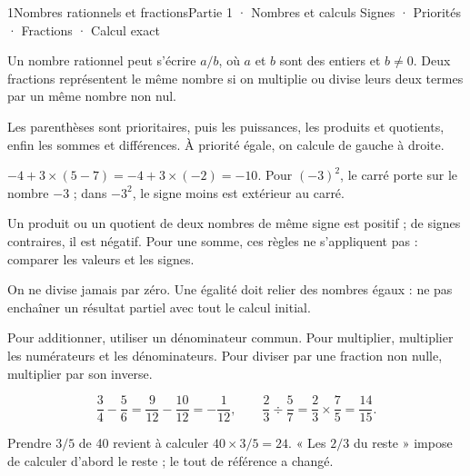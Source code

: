 \begin{ouverture}[courbe]{1}{Nombres rationnels et fractions}{Partie 1 · Nombres et calculs}
{Signes · Priorités · Fractions · Calcul exact}
\end{ouverture}
\pagestyle{otMain}\essentiel\fontsize{11}{15}\selectfont
{}
\begin{definition}Un nombre rationnel peut s’écrire $a/b$, où $a$ et $b$ sont des entiers et $b\ne0$. Deux fractions représentent le même nombre si on multiplie ou divise leurs deux termes par un même nombre non nul.\end{definition}
\begin{propriete}Les parenthèses sont prioritaires, puis les puissances, les produits et quotients, enfin les sommes et différences. À priorité égale, on calcule de gauche à droite.\end{propriete}
\begin{exemple}$-4+3\times(5-7)=-4+3\times(-2)=-10$. Pour $(-3)^2$, le carré porte sur le nombre $-3$ ; dans $-3^2$, le signe moins est extérieur au carré.\end{exemple}
\begin{savoirfaire}Un produit ou un quotient de deux nombres de même signe est positif ; de signes contraires, il est négatif. Pour une somme, ces règles ne s’appliquent pas : comparer les valeurs et les signes.\end{savoirfaire}
\begin{attention}On ne divise jamais par zéro. Une égalité doit relier des nombres égaux : ne pas enchaîner un résultat partiel avec tout le calcul initial.\end{attention}
\clearpage
{}
\begin{propriete}Pour additionner, utiliser un dénominateur commun. Pour multiplier, multiplier les numérateurs et les dénominateurs. Pour diviser par une fraction non nulle, multiplier par son inverse.\end{propriete}
\begin{exemple}
\[\frac34-\frac56=\frac9{12}-\frac{10}{12}=-\frac1{12},
\qquad \frac23\div\frac57=\frac23\times\frac75=\frac{14}{15}.\]
\end{exemple}
\begin{savoirfaire}Prendre $3/5$ de 40 revient à calculer $40\times3/5=24$. « Les $2/3$ du reste » impose de calculer d’abord le reste ; le tout de référence a changé.\end{savoirfaire}
